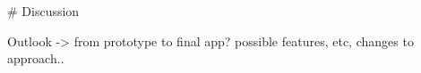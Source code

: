 \begin{markdown}

# Discussion

Outlook -> from prototype to final app? possible features, etc, changes to approach..
    
\end{markdown}